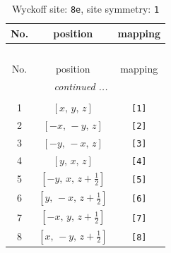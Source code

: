 \documentclass[fleqn,8pt]{jsarticle}
\begin{document}
\renewcommand{\arraystretch}{1.2}
\begin{longtable}{ccc}
\caption{Wyckoff site: {\tt 8e}, site symmetry: {\tt 1}}
 \\
 \hline \hline
No. & position & mapping \\ \hline \endfirsthead

\multicolumn{2}{l}{\tablename\ \thetable{}} \\
 \hline \hline
No. & position & mapping \\ \hline \endhead

 \hline \hline
\multicolumn{2}{r}{\footnotesize\it continued ...} \\ \endfoot

 \hline \hline
\multicolumn{2}{r}{} \\ \endlastfoot

1 & $\left[ x,\, y,\, z \right]$ & {\tt [1]} \\ \hline
2 & $\left[ - x,\, - y,\, z \right]$ & {\tt [2]} \\ \hline
3 & $\left[ - y,\, - x,\, z \right]$ & {\tt [3]} \\ \hline
4 & $\left[ y,\, x,\, z \right]$ & {\tt [4]} \\ \hline
5 & $\left[ - y,\, x,\, z + \frac{1}{2} \right]$ & {\tt [5]} \\ \hline
6 & $\left[ y,\, - x,\, z + \frac{1}{2} \right]$ & {\tt [6]} \\ \hline
7 & $\left[ - x,\, y,\, z + \frac{1}{2} \right]$ & {\tt [7]} \\ \hline
8 & $\left[ x,\, - y,\, z + \frac{1}{2} \right]$ & {\tt [8]} \\
\end{longtable}
\end{document}
